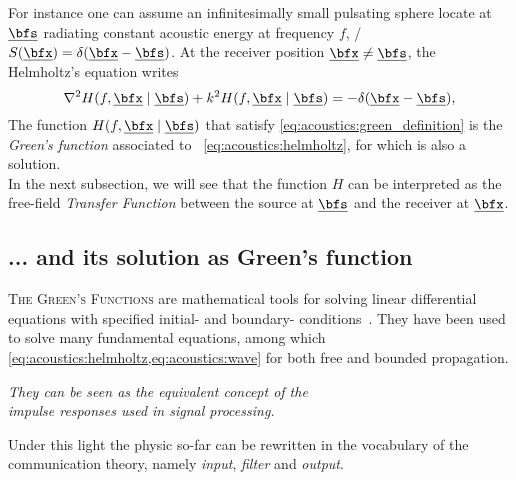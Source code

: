 For instance one can assume an infinitesimally small pulsating sphere locate at $\positionSource$ radiating constant acoustic energy at frequency $f$,
\ie/ $S(\positionMicrophone) = \delta(\positionMicrophone - \positionSource)$.
At the receiver position $\positionMicrophone \neq \positionSource$, the Helmholtz's equation writes
\begin{equation}
    \label{eq:acoustics:green_definition}
    \knabla^2 H(f, \positionMicrophone \mid \positionSource)
     + k^2 H(f, \positionMicrophone \mid \positionSource) = - \delta(\positionMicrophone - \positionSource)
    ,
\end{equation}
The function $H(f, \positionMicrophone \mid \positionSource)$ that satisfy \cref{eq:acoustics:green_definition} is the \textit{Green's function}
associated to ~\cref{eq:acoustics:helmholtz}, for which is also a solution.
\\In the next subsection, we will see that the function $H$ can be interpreted as the free-field \textit{Transfer Function}
between the source at $\positionSource$ and the receiver at $\positionMicrophone$.

\subsection{... and its solution as Green's function}
\textsc{The Green's Functions} are mathematical tools for solving linear differential equations with specified initial- and boundary- conditions~\cite{duffy2015green}.
They have been used to solve many fundamental equations, among which \cref{eq:acoustics:helmholtz,eq:acoustics:wave} for both free and bounded propagation.
\begin{center}
    \textit{
    They can be seen as the equivalent concept of the
    \\ \emph{impulse responses
    }
    used in signal processing.}
\end{center}
Under this light the physic so-far can be rewritten in the vocabulary of the communication theory, namely \textit{input}, \textit{filter} and \textit{output}.

